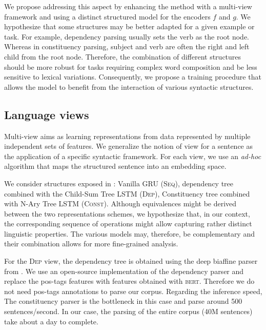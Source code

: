 We propose addressing this aspect by enhancing the method with a multi-view framework and using a distinct structured model for the encoders $f$ and $g$. We hypothesize that some structures may be better adapted for a given example or task. 
For example, dependency parsing usually sets the verb as the root node. Whereas in constituency parsing, subject and verb are often the right and left child from the root node. Therefore, the combination of different structures should be more robust for tasks requiring complex word composition and be less sensitive to lexical variations. Consequently, we propose a training procedure that allows the model to benefit from the interaction of various syntactic structures.

\subsection{Language views}

Multi-view aims as learning representations from data represented by multiple independent sets of features. We generalize the notion of view for a sentence as the application of a specific syntactic framework. For each view, we use an \textit{ad-hoc} algorithm that maps the structured sentence into an embedding space.

We consider structures exposed in : Vanilla GRU (\textsc{Seq}), dependency tree combined with the Child-Sum Tree LSTM (\textsc{Dep}), Constituency tree combined with N-Ary Tree LSTM (\textsc{Const}). Although equivalences might be derived between the  two representations schemes, we hypothesize that, in our context, the corresponding sequence of operations might allow capturing rather distinct linguistic properties. The various models may, therefore, be complementary and their combination allows for more fine-grained analysis. 

For the \textsc{Dep} view, the dependency tree is obtained using the deep biaffine parser from \textcite{dozat_17}. We use an open-source implementation of the dependency parser \parencite{dozat_17} and replace the pos-tags features with features obtained with \textsc{bert}. Therefore we do not need pos-tags annotations to parse our corpus. Regarding the inference speed, The constituency parser is the bottleneck in this case and parse around 500 sentences/second. In our case, the parsing of the entire corpus (40M sentences) take about a day to complete. 

